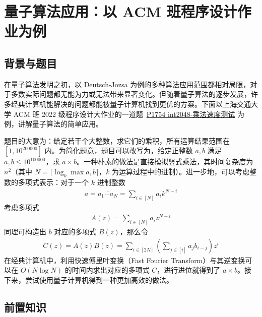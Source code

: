 \section{量子算法应用：以 ACM 班程序设计作业为例}

\subsection{背景与题目}

在量子算法发明之初，以 Deutsch-Jozsa 为例的多种算法应用范围都相对局限，对于多数实际问题都无能为力或无法带来显著变化。但随着量子算法的逐步发展，许多经典计算机能解决的问题都能被量子计算机找到更优的方案。下面以上海交通大学 ACM 班 2022 级程序设计大作业的一道题\ \href{https://acm.sjtu.edu.cn/OnlineJudge/problem?problem_id=1754}{P1754 int2048-乘法速度测试} 为例，讲解量子算法的简单应用。

题目的大意为：给定若干个大整数，求它们的乘积，所有运算结果范围在 $[1,10^{200000}]$ 内。为简化题意，题目可以改写为，给定正整数 $a,b$ 满足 $a,b\le 10^{100000}$，求 $a\times b$。一种朴素的做法是直接模拟竖式乘法，其时间复杂度为 $n^2$（其中 $N=\lceil\log_k\max{a,b}\rceil$，$k$ 为运算过程中的进制）。进一步地，可以考虑整数的多项式表示：对于一个 $k$ 进制整数 \begin{align}
    a=\overline{a_1\cdots a_N}=\sum_{i\in[N]}a_i k^{N-i}
\end{align}
考虑多项式 \begin{align}
    A(z)=\sum_{i\in[N]}a_i z^{N-i}
\end{align}
同理可构造出 $b$ 对应的多项式 $B(z)$，那么令 \begin{align}
    C(z)=A(z)B(z)=\sum_{i\in[2N]}\left(\sum_{j\in[i]}a_jb_{i-j}\right)z^i
\end{align}
在经典计算机中，利用快速傅里叶变换（Fast Fourier Transform）与其逆变换可以在 $O(N\log N)$ 的时间内求出对应的多项式 $C$\cite{cooley1965algorithm}，进行进位就得到了 $a\times b$。接下来，尝试使用量子计算机得到一种更加高效的做法。

\subsection{前置知识}

